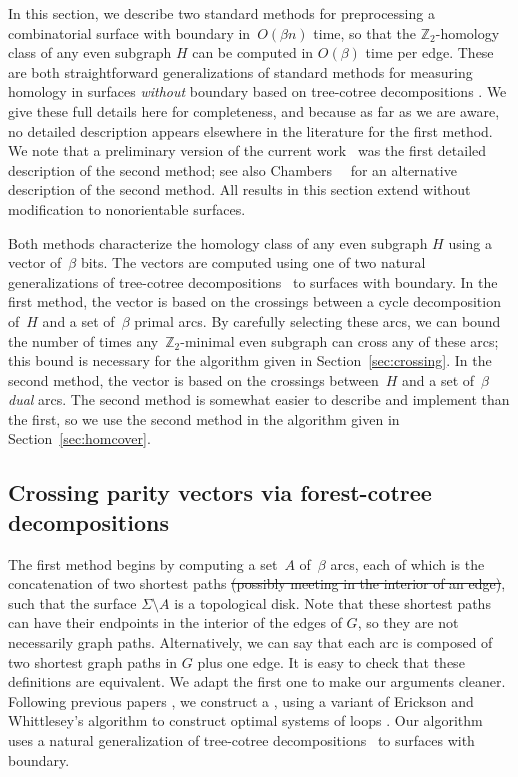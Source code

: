 \documentclass[letterpaper,review]{siamart190516}
\def\Z{\mathbb{Z}}
\def\modified#1{\color{blue}#1 \color{black}}
\begin{document}
In this section, we describe two standard methods for preprocessing a combinatorial surface with boundary in~$O(\beta n)$ time, so that the $\Z_2$-homology class of any even subgraph $H$ can be computed in $O(\beta)$ time per edge.  These are both straightforward generalizations of standard methods for measuring homology in surfaces \emph{without} boundary based on tree-cotree decompositions \cite{ew-gohhg-05, ccelw-scsih-08, e-dgteg-03}.
We give these full details here for completeness, and because as far as we are aware, no detailed description appears
elsewhere in the literature for the first method.  We note that a preliminary version of the current
work~\cite{en-mcsnc-11} was the first detailed description of the second method;
see also Chambers~\etal~\cite{bcfn-mchbs-17} for an alternative description of the second method.
All results in this section extend without modification to nonorientable surfaces.


Both methods characterize the homology class of any even subgraph $H$ using a vector of~$\beta$ bits.
The vectors are computed using one of two natural generalizations of tree-cotree decompositions~\cite{e-dgteg-03} to surfaces with boundary.
In the first method, the vector is based on the crossings between a cycle decomposition of~$H$ and a set of~$\beta$ primal arcs.
By carefully selecting these arcs, we can bound the number of times any~$\Z_2$-minimal even subgraph can cross any of these arcs; this bound is necessary for the algorithm given in Section~\ref{sec:crossing}.
In the second method, the vector is based on the crossings between~$H$ and a set of~$\beta$ \emph{dual} arcs.
The second method is somewhat easier to describe and implement than the first, so we use the second method in the algorithm given in Section~\ref{sec:homcover}.


\subsection{Crossing parity vectors via forest-cotree decompositions}
\label{sec:characterizing_crossings}

The first method begins by computing a set~$A$ of~$\beta$ arcs, each of which is the concatenation of two shortest paths \sout{(possibly meeting in the interior of an edge)}, such that the surface $\Sigma\setminus A$ is a topological disk. \modified{Note that these shortest paths can have their endpoints in the interior of the edges of $G$, so they are not necessarily graph paths.  Alternatively, we can say that each arc is composed of two shortest graph paths in $G$ plus one edge.  It is easy to check that these definitions are equivalent.  We adapt the first one to make our arguments cleaner.}
Following previous papers \cite{ccelw-scsih-08, ce-tnpcs-10, c-scgsp-10}, we construct a , using a variant of Erickson and Whittlesey's algorithm to construct optimal systems of loops \cite{ew-gohhg-05}.  Our algorithm uses a natural generalization of tree-cotree decompositions~\cite{e-dgteg-03} to surfaces with boundary.
\end{document}
